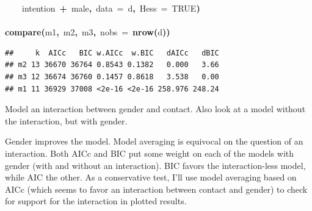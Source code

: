 \documentclass{article}
\makeatletter
\newcommand{\hlnumber}[1]{\textcolor[rgb]{0,0,0}{#1}}%
\newcommand{\hlfunctioncall}[1]{\textcolor[rgb]{.5,0,.33}{\textbf{#1}}}%
\newcommand{\hlkeyword}[1]{\textbf{#1}}%
\newcommand{\hlargument}[1]{\textcolor[rgb]{.69,.25,.02}{#1}}%
\newcommand{\hlsymbol}[1]{#1}%
\newcommand{\hlstd}[1]{\textcolor[rgb]{0,0,0}{#1}}%
\newenvironment{kframe}{%
 \def\FrameCommand##1{\hskip\@totalleftmargin \hskip-\fboxsep
 \colorbox{shadecolor}{##1}\hskip-\fboxsep
     \hskip-\linewidth \hskip-\@totalleftmargin \hskip\columnwidth}%
 \MakeFramed {\advance\hsize-\width
   \@totalleftmargin\z@ \linewidth\hsize
   \@setminipage}}%
 {\par\unskip\endMakeFramed}
\newenvironment{knitrout}{}{} %
\makeatother
\begin{document}
\begin{knitrout}
{\begin{kframe}
\begin{flushleft}
\hlstd{}{\ }{\ }{\ }{\ }\hlsymbol{intention}{\ }\hlkeyword{+}{\ }\hlsymbol{male}\hlkeyword{,}{\ }\hlargument{data}{\ }\hlargument{=}{\ }\hlsymbol{d}\hlkeyword{,}{\ }\hlargument{Hess}{\ }\hlargument{=}{\ }\hlnumber{TRUE}\hlkeyword{)}\hspace*{\fill}\\
\hlstd{}\hspace*{\fill}\\
\hlstd{}\hlfunctioncall{compare}\hlkeyword{(}\hlsymbol{m1}\hlkeyword{,}{\ }\hlsymbol{m2}\hlkeyword{,}{\ }\hlsymbol{m3}\hlkeyword{,}{\ }\hlargument{nobs}{\ }\hlargument{=}{\ }\hlfunctioncall{nrow}\hlkeyword{(}\hlsymbol{d}\hlkeyword{)}\hlkeyword{)}\mbox{}
\normalfont
\end{flushleft}
\begin{verbatim}
##     k  AICc   BIC w.AICc  w.BIC   dAICc   dBIC
## m2 13 36670 36764 0.8543 0.1382   0.000   3.66
## m3 12 36674 36760 0.1457 0.8618   3.538   0.00
## m1 11 36929 37008 <2e-16 <2e-16 258.976 248.24
\end{verbatim}
\end{kframe}}
\end{knitrout}


Model an interaction between gender and contact. 
Also look at a model without the interaction, but with gender. 

Gender improves the model. 
Model averaging is equivocal on the question of an interaction. 
Both AICc and BIC put some weight on each of the models with gender (with and without an interaction). 
BIC favors the interaction-less model, while AIC the other. 
As a conservative test, I'll use model averaging based on AICc (which seems to favor an interaction between contact and gender) to  check for support for the interaction in plotted results. 
\end{document}
